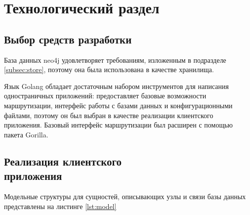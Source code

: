 \chapter{Технологический раздел}\label{sec:impl}
\section{Выбор средств разработки}
База данных neo4j\cite{neo4docs} удовлетворяет требованиям, изложенным в подразделе \ref{subsec:store}, поэтому она была использована в качестве хранилища. 

Язык Golang\cite{go} обладает достаточным набором инструментов для написания одностраничных приложений: предоставляет базовые возможности маршрутизации, интерфейс работы с базами данных и конфигурационными файлами, поэтому он был выбран в качестве реализации клиентского приложения. Базовый интерфейс маршрутизации был расширен с помощью пакета Gorilla\cite{gorilla}.

\section[Реализация клиентского приложения]{Реализация клиентского\\ приложения}
Модельные структуры для сущностей, описывающих узлы и связи базы данных представлены на листинге \ref{lst:model}

